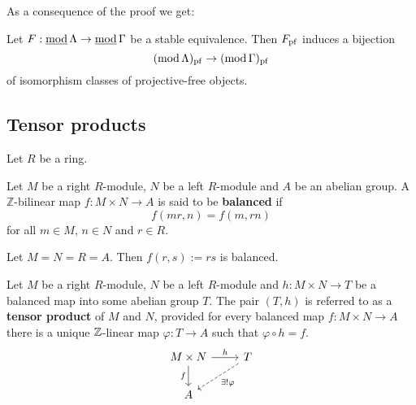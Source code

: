 
As a consequence of the proof we get:
\begin{proposition}\label{3.3.3}
  Let $F : \operatorname{\underline{\operatorname{mod}}} \Lambda \to \operatorname{\underline{\operatorname{mod}}} \Gamma$ be a stable equivalence. Then $F_{\mathrm{pf}}$ induces
  a bijection
    \[ (\operatorname{mod} \Lambda)_{\mathrm{pf}} \to (\operatorname{mod} \Gamma)_{\mathrm{pf}} \]
  of isomorphism classes of projective-free objects.
\end{proposition}


\subsection*{Tensor products}


Let $R$ be a ring.


\begin{definition}
Let $M$ be a right $R$-module, $N$ be a left $R$-module and $A$ be an abelian group. A $\mathbb{Z}$-bilinear map $f: M \times N \to A$ is said to be \textbf{balanced} if
\[
f(mr, n) = f(m,rn)
\]
for all $m\in M$, $n\in N$ and $r\in R$.
\end{definition}


\begin{example}
  Let $M = N = R = A$. Then $f(r,s) := rs$ is balanced.
\end{example}


\begin{definition}
Let $M$ be a right $R$-module, $N$ be a left $R$-module and $h: M \times N \to T$ be a balanced map into some abelian group $T$. The pair $(T,h)$ is referred to as a \textbf{tensor product} of $M$ and $N$, provided for every balanced map $f:M\times N\to A$ there is a unique $\mathbb{Z}$-linear map $\varphi:T\to A$ such that $\varphi\circ h=f$.
\[
\begin{tikzcd}
  M \times N \ar[d, "f"'] \ar[r, "h"] & T \ar[dl,dashed, "\exists!\varphi"] \\
  A
\end{tikzcd}
\]
\end{definition}

